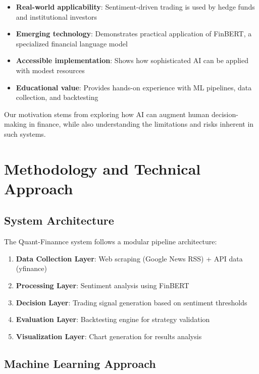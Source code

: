 \documentclass[12pt]{article}
\begin{document}
\begin{itemize}
\item \textbf{Real-world applicability}: Sentiment-driven trading is used by hedge funds and institutional investors
\item \textbf{Emerging technology}: Demonstrates practical application of FinBERT, a specialized financial language model
\item \textbf{Accessible implementation}: Shows how sophisticated AI can be applied with modest resources
\item \textbf{Educational value}: Provides hands-on experience with ML pipelines, data collection, and backtesting
\end{itemize}

Our motivation stems from exploring how AI can augment human decision-making in finance, while also understanding the limitations and risks inherent in such systems.

\section{Methodology and Technical Approach}

\subsection{System Architecture}

The Quant-Finannce system follows a modular pipeline architecture:

\begin{enumerate}
\item \textbf{Data Collection Layer}: Web scraping (Google News RSS) + API data (yfinance)
\item \textbf{Processing Layer}: Sentiment analysis using FinBERT
\item \textbf{Decision Layer}: Trading signal generation based on sentiment thresholds
\item \textbf{Evaluation Layer}: Backtesting engine for strategy validation
\item \textbf{Visualization Layer}: Chart generation for results analysis
\end{enumerate}

\subsection{Machine Learning Approach}
\end{document}
